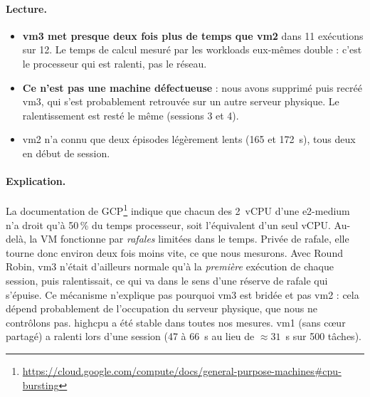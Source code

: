 \paragraph{Lecture.}
\begin{itemize}
  \item \textbf{vm3 met presque deux fois plus de temps que vm2} dans 11 exécutions
        sur 12. Le temps de calcul mesuré par les workloads eux-mêmes double : c'est
        le processeur qui est ralenti, pas le réseau.
  \item \textbf{Ce n'est pas une machine défectueuse} : nous avons supprimé puis
        recréé vm3, qui s'est probablement retrouvée sur un autre serveur
        physique. Le ralentissement est resté le même (sessions 3 et 4).
  \item vm2 n'a connu que deux épisodes légèrement lents (165 et 172~s), tous deux
        en début de session.
\end{itemize}

\paragraph{Explication.} La documentation de
GCP\footnote{\url{https://cloud.google.com/compute/docs/general-purpose-machines\#cpu-bursting}}
indique que chacun des 2~vCPU d'une e2-medium n'a droit qu'à 50\,\% du temps
processeur, soit l'équivalent d'un seul vCPU. Au-delà, la VM fonctionne par
\emph{rafales} limitées dans le temps. Privée de rafale, elle tourne donc environ
deux fois moins vite, ce que nous mesurons. Avec Round Robin, vm3 n'était
d'ailleurs normale qu'à la \emph{première} exécution de chaque session, puis
ralentissait, ce qui va dans le sens d'une réserve de rafale qui s'épuise. Ce
mécanisme n'explique pas pourquoi vm3 est bridée et pas vm2 : cela dépend
probablement de l'occupation du serveur physique, que nous ne contrôlons pas.
highcpu a été stable dans toutes nos mesures. vm1 (sans cœur partagé) a ralenti
lors d'une session (47 à 66~s au lieu de $\approx 31$~s sur 500 tâches).

